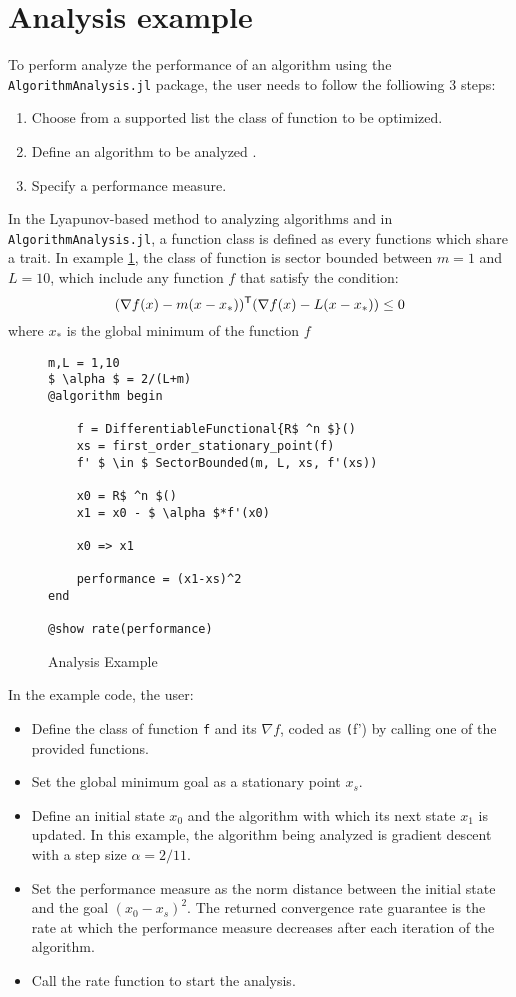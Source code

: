 \section{Analysis example}
To perform analyze the performance of an algorithm using the \texttt{AlgorithmAnalysis.jl} package, the user needs to follow the folliowing 3 steps:
\begin{enumerate}
	\item Choose from a supported list the class of function to be optimized.
	\item Define an algorithm to be analyzed .
	\item Specify a performance measure.
\end{enumerate}
In the Lyapunov-based method to analyzing algorithms and in \texttt{AlgorithmAnalysis.jl}, a function class is defined as every functions which share a trait. In example \ref{ex_analysis}, the class of function is sector bounded between $m=1$ and $L=10$, which include any function $f$ that satisfy the condition:
\begin{equation}
  (\nabla f(x) - m(x-x_*))^{\mathsf{T}} (\nabla f(x) - L(x-x_*)) \leq 0
\end{equation}
where $x_*$ is the global minimum of the function $f$
\begin{figure}[h!]
	\begin{lstlisting}[mathescape]
m,L = 1,10
$ \alpha $ = 2/(L+m)
@algorithm begin

	f = DifferentiableFunctional{R$ ^n $}()
	xs = first_order_stationary_point(f)
	f' $ \in $ SectorBounded(m, L, xs, f'(xs))

	x0 = R$ ^n $()
	x1 = x0 - $ \alpha $*f'(x0)

	x0 => x1

	performance = (x1-xs)^2
end

@show rate(performance)
\end{lstlisting}
\caption{Analysis Example}
\label{ex_analysis}
\end{figure} In the example code, the user:
\begin{itemize}
	\item Define the class of function \texttt{f} and its $\nabla f$, coded as \texttt(f') by calling one of the provided functions.
	\item Set the global minimum goal as a stationary point $ x_s $.
	\item Define an initial state $ x_0 $ and the algorithm with which its next state $ x_1$ is updated. In this example, the algorithm being analyzed is gradient descent with a step size $ \alpha = 2/11$.
	\item Set the performance measure as the norm distance between the initial state and the goal $ (x_0 - x_s)^2 $. The returned convergence rate guarantee is the rate at which the performance measure decreases after each iteration of the algorithm.
	\item Call the rate function to start the analysis.
\end{itemize}


